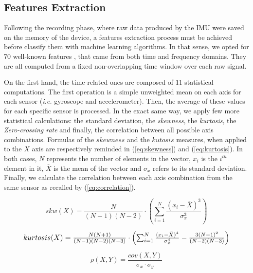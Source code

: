 \documentclass[conference]{IEEEtran}
\begin{document}
\subsection{Features Extraction}

Following the recording phase, where raw data produced by the IMU were saved on the memory of the device, a features extraction process must be achieved before classify them with machine learning algorithms. In that sense, we opted for 70 well-known features \cite{Bussmann2001, Bayat2014, Cleland2013, Kwapisz2011, Yang2008, Ravi2005, Shoaib2013, Gao2014}, that came from both time and frequency domains. They are all computed from a fixed non-overlapping time window over each raw signal.

On the first hand, the time-related ones are composed of 11 statistical computations. The first operation is a simple unweighted mean on each axis for each sensor (\textit{i.e.} gyroscope and accelerometer). Then, the average of these values for each specific sensor is processed. In the exact same way, we apply few more statistical calculations: the standard deviation, the \textit{skewness}, the \textit{kurtosis}, the \textit{Zero-crossing rate} and finally, the correlation between all possible axis combinations. Formulas of the $skewness$ and the $kutosis$ measures, when applied to the $X$ axis are respectively reminded in (\ref{eq:skewness}) and (\ref{eq:kurtosis}). In both cases, $N$ represents the number of elements in the vector, $x_i$ is the $i^{th}$ element in it, $\bar{X}$ is the mean of the vector and $\sigma_x$ refers to its standard deviation. Finally, we calculate the correlation between each axis combination from the same sensor as recalled by (\ref{eq:correlation}).

\begin{equation}
	\label{eq:skewness}
	skw(X) = \frac{N}{(N-1)(N-2)}\cdot\left(\sum_{i=1}^{N}{\frac{(x_i-\bar{X})^3}{\sigma_x^3}}\right)
\end{equation}

\begin{equation}
	\label{eq:kurtosis}
	\resizebox{.9\columnwidth}{!} 
	{
  		$kurtosis(X) = \frac{N(N+1)}{(N-1)(N-2)(N-3)}\cdot\left(\sum_{i=1}^{N}{\frac{(x_i-\bar{X})^4}{\sigma_x^4}-\frac{3(N-1)^2}{(N-2)(N-3)}}\right)$
  	}
\end{equation}

\begin{equation}
	\label{eq:correlation}
	\rho(X,Y) = \frac{cov(X,Y)}{\sigma_x\cdot\sigma_y}
\end{equation}
\end{document}
